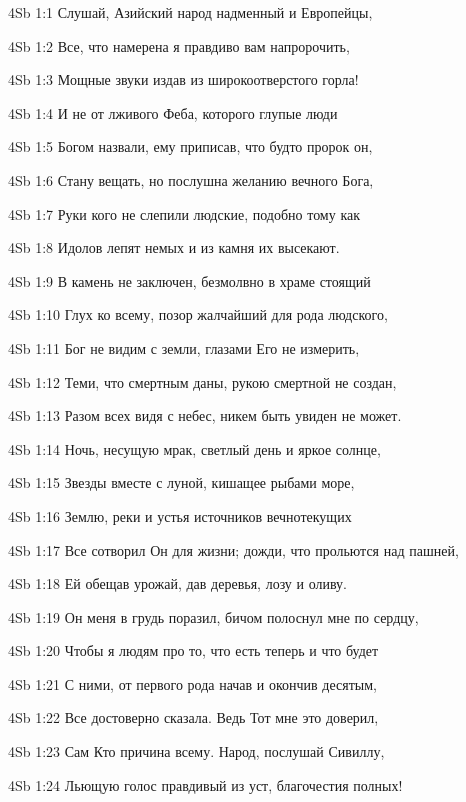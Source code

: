 \vs 4Sb 1:1 Слушай, Азийский народ надменный и Европейцы, 

\vs 4Sb 1:2 Все, что намерена я правдиво вам напророчить, 

\vs 4Sb 1:3 Мощные звуки издав из широкоотверстого горла! 

\vs 4Sb 1:4 И не от лживого Феба, которого глупые люди

\vs 4Sb 1:5 Богом назвали, ему приписав, что будто пророк он, 

\vs 4Sb 1:6 Стану вещать, но послушна желанию вечного Бога, 

\vs 4Sb 1:7 Руки кого не слепили людские, подобно тому как 

\vs 4Sb 1:8 Идолов лепят немых и из камня их высекают. 

\vs 4Sb 1:9 В камень не заключен, безмолвно в храме стоящий  

\vs 4Sb 1:10 Глух ко всему, позор жалчайший для рода людского, 

\vs 4Sb 1:11 Бог не видим с земли, глазами Его не измерить,

\vs 4Sb 1:12 Теми, что смертным даны, рукою смертной не создан, 

\vs 4Sb 1:13 Разом всех видя с небес, никем быть увиден не может. 

\vs 4Sb 1:14 Ночь, несущую мрак, светлый день и яркое солнце, 

\vs 4Sb 1:15 Звезды вместе с луной, кишащее рыбами море,

\vs 4Sb 1:16 Землю, реки и устья источников вечнотекущих  

\vs 4Sb 1:17 Все сотворил Он для жизни; дожди, что прольются над пашней,

\vs 4Sb 1:18 Ей обещав урожай, дав деревья, лозу и оливу. 

\vs 4Sb 1:19 Он меня в грудь поразил, бичом полоснул мне по сердцу, 

\vs 4Sb 1:20 Чтобы я людям про то, что есть теперь и что будет

\vs 4Sb 1:21 С ними, от первого рода начав и окончив десятым, 

\vs 4Sb 1:22 Все достоверно сказала. Ведь Тот мне это доверил, 

\vs 4Sb 1:23 Сам Кто причина всему. Народ, послушай Сивиллу, 

\vs 4Sb 1:24 Льющую голос правдивый из уст, благочестия полных!

